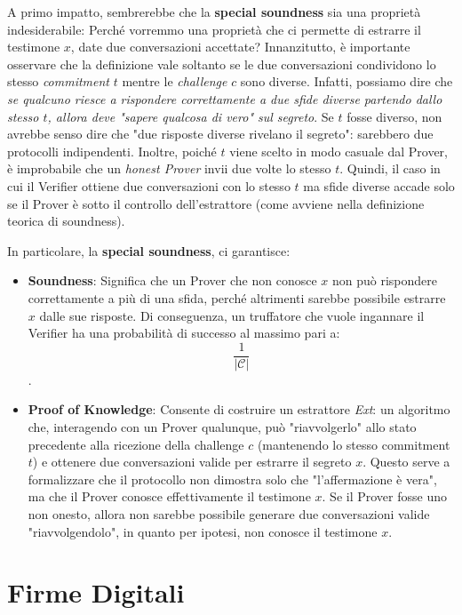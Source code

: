 A primo impatto, sembrerebbe che la \textbf{special soundness} sia una proprietà indesiderabile: Perché vorremmo una proprietà che ci permette di estrarre il testimone $x$, date due conversazioni accettate?
Innanzitutto, è importante osservare che la definizione vale soltanto se le due conversazioni condividono lo stesso \textit{commitment} $t$ mentre le \textit{challenge} $c$ sono diverse. Infatti, possiamo dire che \textit{se qualcuno riesce a rispondere correttamente a due sfide diverse partendo dallo stesso $t$, allora deve "sapere qualcosa di vero" sul segreto}. Se $t$ fosse diverso, non avrebbe senso dire che "due risposte diverse rivelano il segreto": sarebbero due protocolli indipendenti. Inoltre, poiché $t$ viene scelto in modo casuale dal Prover, è improbabile che un \textit{honest Prover} invii due volte lo stesso $t$.
Quindi, il caso in cui il Verifier ottiene due conversazioni con lo stesso $t$ ma sfide diverse accade solo se il Prover è sotto il controllo dell'estrattore (come avviene nella definizione teorica di soundness).

In particolare, la \textbf{special soundness}, ci garantisce:
\begin{itemize}
    \item \textbf{Soundness}: Significa che un Prover che non conosce $x$ non può rispondere correttamente a più di una sfida, perché altrimenti sarebbe possibile estrarre $x$ dalle sue risposte.
    Di conseguenza, un truffatore che vuole ingannare il Verifier ha una probabilità di successo al massimo pari a: \[\frac{1}{|\mathcal{C}|}\].
    \item \textbf{Proof of Knowledge}: Consente di costruire un estrattore \textit{Ext}: un algoritmo che, interagendo con un Prover qualunque, può "riavvolgerlo" allo stato precedente alla ricezione della challenge $c$ (mantenendo lo stesso commitment $t$) e ottenere due conversazioni valide per estrarre il segreto $x$. Questo serve a formalizzare che il protocollo non dimostra solo che "l'affermazione è vera", ma che il Prover conosce effettivamente il testimone $x$. Se il Prover fosse uno non onesto, allora non sarebbe possibile generare due conversazioni valide "riavvolgendolo", in quanto per ipotesi, non conosce il testimone $x$.
\end{itemize}

\newpage

\section{Firme Digitali}\label{sec:sig-dig}

